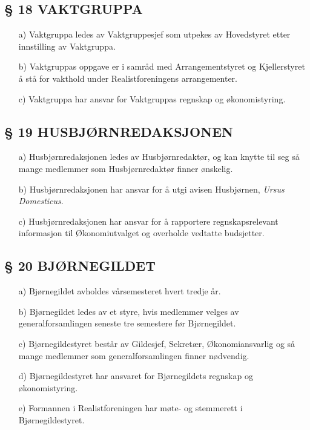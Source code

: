 \subsection*{§ 18 VAKTGRUPPA}

\begin{itemize}
\item[a)] Vaktgruppa ledes av Vaktgruppesjef som utpekes av Hovedstyret etter
innstilling av Vaktgruppa.

\item[b)] Vaktgruppas oppgave er i samråd med Arrangementstyret og
Kjellerstyret å stå for vakthold under Realistforeningens
arrangementer.

\item[c)] Vaktgruppa har ansvar for Vaktgruppas regnskap og økonomistyring.
\end{itemize}


\subsection*{§ 19 HUSBJØRNREDAKSJONEN}
\begin{itemize}
\item[a)] Husbjørnredaksjonen ledes av Husbjørnredaktør, og kan knytte
  til seg så mange medlemmer som Husbjørnredaktør finner ønskelig.

\item[b)] Husbjørnredaksjonen har ansvar for å utgi avisen
  Husbjørnen, \emph{Ursus Domesticus}.

\item[c)] Husbjørnredaksjonen har ansvar for å rapportere
  regnskapsrelevant informasjon til Økonomiutvalget og overholde
  vedtatte budsjetter. 
\end{itemize}

\subsection*{§ 20 BJØRNEGILDET} 

\begin{itemize}
\item[a)] Bjørnegildet avholdes vårsemesteret hvert tredje år. 

\item[b)] Bjørnegildet ledes av et styre, hvis medlemmer velges av
generalforsamlingen seneste tre semestere før Bjørnegildet.

\item[c)] Bjørnegildestyret består av Gildesjef, Sekretær, Økonomiansvarlig
og så mange medlemmer som generalforsamlingen finner nødvendig.

\item[d)] Bjørnegildestyret har ansvaret for Bjørnegildets regnskap og
økonomistyring.

\item[e)] Formannen i Realistforeningen har møte- og stemmerett i
Bjørnegildestyret.
\end{itemize}


